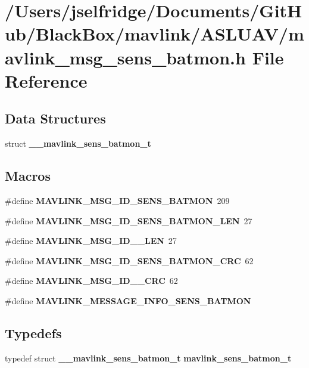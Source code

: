 \section{/\+Users/jselfridge/\+Documents/\+Git\+Hub/\+Black\+Box/mavlink/\+A\+S\+L\+U\+A\+V/mavlink\+\_\+msg\+\_\+sens\+\_\+batmon.h File Reference}
\label{mavlink__msg__sens__batmon_8h}
\subsection*{Data Structures}
\begin{DoxyCompactItemize}
\item 
struct \textbf{ \+\_\+\+\_\+mavlink\+\_\+sens\+\_\+batmon\+\_\+t}
\end{DoxyCompactItemize}
\subsection*{Macros}
\begin{DoxyCompactItemize}
\item 
\#define \textbf{ M\+A\+V\+L\+I\+N\+K\+\_\+\+M\+S\+G\+\_\+\+I\+D\+\_\+\+S\+E\+N\+S\+\_\+\+B\+A\+T\+M\+ON}~209
\item 
\#define \textbf{ M\+A\+V\+L\+I\+N\+K\+\_\+\+M\+S\+G\+\_\+\+I\+D\+\_\+\+S\+E\+N\+S\+\_\+\+B\+A\+T\+M\+O\+N\+\_\+\+L\+EN}~27
\item 
\#define \textbf{ M\+A\+V\+L\+I\+N\+K\+\_\+\+M\+S\+G\+\_\+\+I\+D\+\_\+\_\+\+L\+EN}~27
\item 
\#define \textbf{ M\+A\+V\+L\+I\+N\+K\+\_\+\+M\+S\+G\+\_\+\+I\+D\+\_\+\+S\+E\+N\+S\+\_\+\+B\+A\+T\+M\+O\+N\+\_\+\+C\+RC}~62
\item 
\#define \textbf{ M\+A\+V\+L\+I\+N\+K\+\_\+\+M\+S\+G\+\_\+\+I\+D\+\_\+\_\+\+C\+RC}~62
\item 
\#define \textbf{ M\+A\+V\+L\+I\+N\+K\+\_\+\+M\+E\+S\+S\+A\+G\+E\+\_\+\+I\+N\+F\+O\+\_\+\+S\+E\+N\+S\+\_\+\+B\+A\+T\+M\+ON}
\end{DoxyCompactItemize}
\subsection*{Typedefs}
\begin{DoxyCompactItemize}
\item 
typedef struct \textbf{ \+\_\+\+\_\+mavlink\+\_\+sens\+\_\+batmon\+\_\+t} \textbf{ mavlink\+\_\+sens\+\_\+batmon\+\_\+t}
\end{DoxyCompactItemize}


